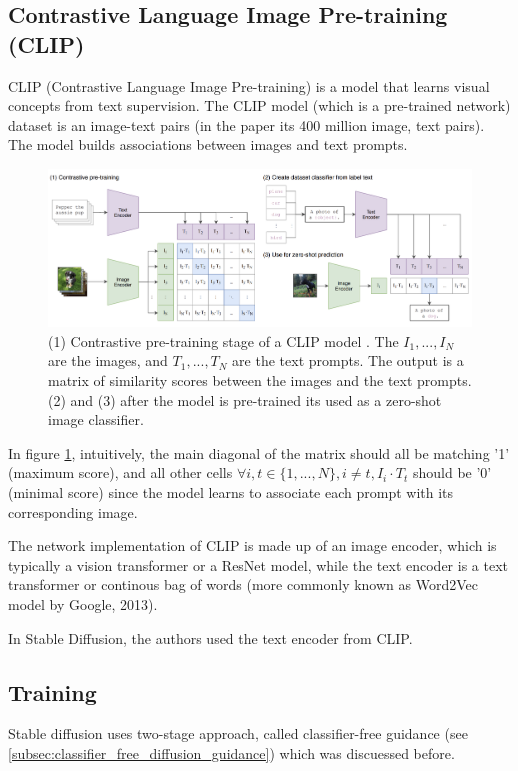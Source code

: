 \subsection{Contrastive Language Image Pre-training (CLIP)}

\label{subsec:clip}

CLIP (Contrastive Language Image Pre-training) \cite{openai_clip} is a model that learns visual concepts from text supervision. The CLIP model (which is a pre-trained network) dataset is an image-text pairs (in the paper its 400 million image, text pairs). The model builds associations between images and text prompts. 

\begin{figure}
    \centering
    \includegraphics[width=1\textwidth]{images/diffusion_models/stable_diffusion/clip.png}
    \caption{(1) Contrastive pre-training stage of a CLIP model \cite{openai_clip}. The $I_1, ..., I_N$ are the images, and $T_1, ..., T_N$ are the text prompts. The output is a matrix of similarity scores between the images and the text prompts. (2) and (3) after the model is pre-trained its used as a zero-shot image classifier.}
    \label{fig:openai_clip}
\end{figure}

In figure \ref{fig:openai_clip}, intuitively, the main diagonal of the matrix should all be matching '1' (maximum score), and all other cells $\forall i,t \in \{1, ..., N\}, i \neq t, I_i \cdot T_t$ should be '0' (minimal score) since the model learns to associate each prompt with its corresponding image.

The network implementation of CLIP is made up of an image encoder, which is typically a vision transformer \cite{vision_transformer} or a ResNet \cite{resnet} model, while the text encoder is a text transformer \cite{transformer} or continous bag of words \cite{cbow_word2vec} (more commonly known as Word2Vec model by Google, 2013).

In Stable Diffusion, the authors used the text encoder from CLIP. %












\subsection{Training}

Stable diffusion uses two-stage approach, called classifier-free guidance (see \ref{subsec:classifier_free_diffusion_guidance}) which was discuessed before. 